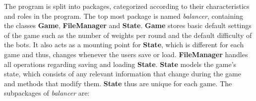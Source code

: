 \documentclass[12pt]{article}
\begin{document}
The program is split into packages, categorized according to their
characteristics and roles in the program. The top most package is named
\textit{balancer}, containing the classes \textbf{Game}, \textbf{FileManager}
and \textbf{State}. \textbf{Game} stores basic default settings of the game such
as the number of weights per round and the default difficulty of the bots. It
also acts as a mounting point for \textbf{State}, which is different for each
game and thus, changes whenever the users save or load.  \textbf{FileManager}
handles all operations regarding saving and loading \textbf{State}.
\textbf{State} models the game's state, which consists of any relevant
information that change during the game and methods that modify them.
\textbf{State} thus are unique for each game. The subpackages of
\textit{balancer} are:
\end{document}

